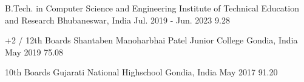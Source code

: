 

\begin{cventries}

  \cventry
    {B.Tech. in Computer Science and Engineering} %
    {Institute of Technical Education and Research} %
    {Bhubaneswar, India} %
    {Jul. 2019 - Jun. 2023} %
    {9.28} %

  \cventry
    {+2 / 12th Boards} %
    {Shantaben Manoharbhai Patel Junior College} %
    {Gondia, India} %
    {May 2019} %
    {75.08} %

  \cventry
    {10th Boards} %
    {Gujarati National Highschool} %
    {Gondia, India} %
    {May 2017} %
    {91.20} %

\end{cventries}
